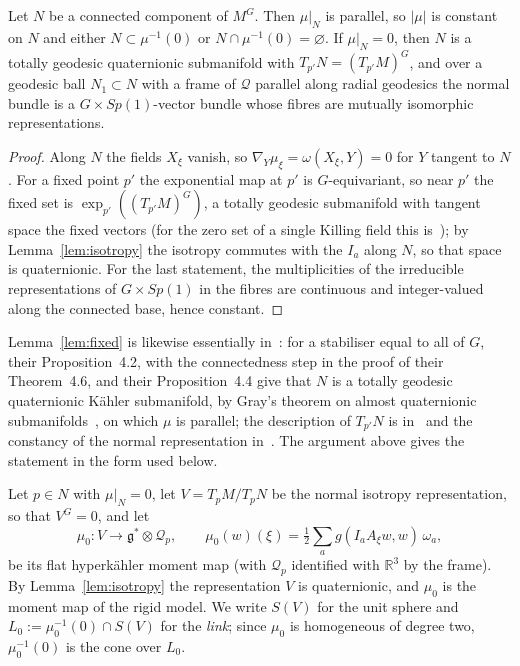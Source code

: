 \begin{lemma}\label{lem:fixed}
Let $N$ be a connected component of $M^G$. Then $\mu|_N$ is parallel, so $|\mu|$ is constant
on $N$ and either $N\subset\mu^{-1}(0)$ or $N\cap\mu^{-1}(0)=\varnothing$. If $\mu|_N=0$,
then $N$ is a totally geodesic quaternionic submanifold with $T_{p'}N=(T_{p'}M)^G$, and over a
geodesic ball $N_1\subset N$ with a frame of $\mathcal Q$ parallel along radial geodesics the
normal bundle is a $G\times Sp(1)$-vector bundle whose fibres are mutually isomorphic
representations.
\end{lemma}

\begin{proof}
Along $N$ the fields $X_\xi$ vanish, so $\nabla_Y\mu_\xi=\omega(X_\xi,Y)=0$ for $Y$ tangent to
$N$. For a fixed point $p'$ the exponential map at $p'$ is $G$-equivariant, so near $p'$ the
fixed set is $\exp_{p'}((T_{p'}M)^G)$, a totally geodesic submanifold with tangent space the
fixed vectors (for the zero set of a single Killing field this is~\cite{Kobayashi:1958}); by
Lemma~\ref{lem:isotropy} the isotropy commutes with the $I_a$ along $N$, so that space is
quaternionic. For the last statement, the multiplicities of the irreducible representations of
$G\times Sp(1)$ in the fibres are continuous and integer-valued along the connected base, hence
constant.
\end{proof}

Lemma~\ref{lem:fixed} is likewise essentially in~\cite{DancerSwann:1997}: for a stabiliser equal to
all of $G$, their Proposition~4.2, with the connectedness step in the proof of their Theorem~4.6, and
their Proposition~4.4 give that $N$ is a totally geodesic quaternionic K\"ahler submanifold, by Gray's
theorem on almost quaternionic submanifolds~\cite{Gray:1969}, on which $\mu$ is parallel; the description of $T_{p'}N$ is in~\cite[Sect.~2]{DancerSwann:1997} and the
constancy of the normal representation in~\cite[Sect.~4]{DancerSwann:1997}. The argument above gives the
statement in the form used below.

Let $p\in N$ with $\mu|_N=0$, let $V=T_pM/T_pN$ be the normal isotropy representation, so that
$V^G=0$, and let
\begin{equation}
 \mu_0:V\to\mathfrak g^*\otimes\mathcal Q_p,\qquad
 \mu_0(w)(\xi)=\tfrac12\textstyle\sum_a g(I_aA_\xi w,w)\,\omega_a ,
 \label{eq:flat-moment}
\end{equation}
be its flat hyperk\"ahler moment map (with $\mathcal Q_p$ identified with $\mathbb R^3$ by the
frame). By Lemma~\ref{lem:isotropy} the representation $V$ is quaternionic, and $\mu_0$ is the
moment map of the rigid model. We write $S(V)$ for the unit sphere and $L_0:=\mu_0^{-1}(0)\cap
S(V)$ for the \emph{link}; since $\mu_0$ is homogeneous of degree two, $\mu_0^{-1}(0)$ is the
cone over $L_0$.

